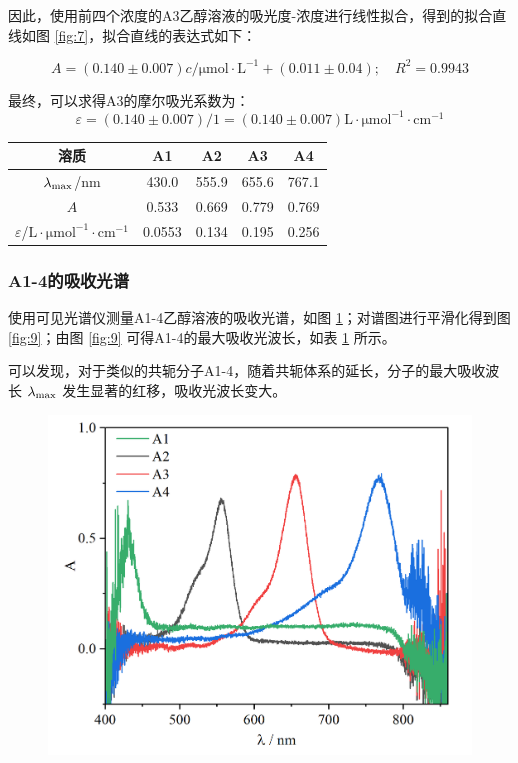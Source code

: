 因此，使用前四个浓度的A3乙醇溶液的吸光度-浓度进行线性拟合，得到的拟合直线如图 \ref{fig:7}，拟合直线的表达式如下：

\begin{equation*}
    A = (0.140 \pm 0.007)c/\mathrm{\mu mol\cdot L^{-1}} + (0.011\pm 0.04);\quad R^2=0.9943
\end{equation*}

最终，可以求得A3的摩尔吸光系数为：
\begin{equation*}
    \varepsilon = (0.140 \pm 0.007)/1 = (0.140 \pm 0.007)\mathrm{L\cdot \mu mol^{-1}\cdot cm^{-1}}
\end{equation*}

\begin{table}[H]
    \centering
    \begin{tabular}{c|cccc}
    \toprule
     溶质 & A1 & A2 & A3 & A4 \\
     \midrule
     $\lambda_{\rm max}$/$\mathrm{nm}$  & 430.0 & 555.9 & 655.6 & 767.1\\
     $A$ & 0.533 & 0.669 & 0.779 & 0.769 \\
     $\varepsilon$/$\mathrm{L\cdot \mu mol^{-1}\cdot cm^{-1}}$ & 0.0553 & 0.134 & 0.195 & 0.256 \\
     \bottomrule
    \end{tabular}
    \label{tab:4}
\end{table}

\subsubsection{A1-4的吸收光谱}

使用可见光谱仪测量A1-4乙醇溶液的吸收光谱，如图 \ref{fig:8}；对谱图进行平滑化得到图 \ref{fig:9}；由图 \ref{fig:9} 可得A1-4的最大吸收光波长，如表 \ref{tab:4} 所示。

可以发现，对于类似的共轭分子A1-4，随着共轭体系的延长，分子的最大吸收波长 $\lambda_{\rm max}$ 发生显著的红移，吸收光波长变大。

\begin{figure}[H]
    \centering
    \includegraphics[width=.62\textwidth]{figures2/2-2.png}
    \label{fig:8}
\end{figure}

